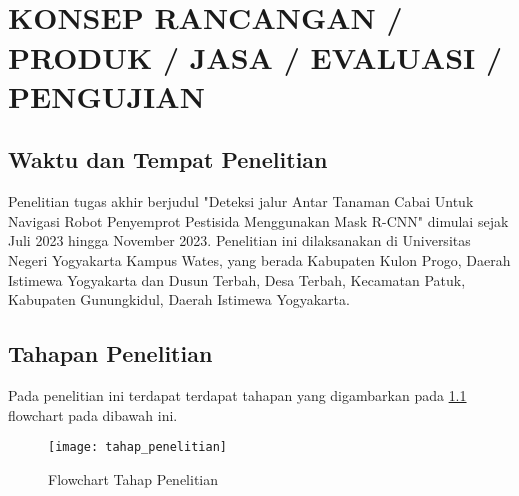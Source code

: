 
\chapter[KONSEP RANCANGAN / PRODUK / JASA / EVALUASI / PENGUJIAN]{\\ KONSEP RANCANGAN / PRODUK / JASA / EVALUASI / PENGUJIAN}

\section{Waktu dan Tempat Penelitian}
Penelitian tugas akhir berjudul "Deteksi jalur Antar Tanaman Cabai Untuk Navigasi Robot Penyemprot Pestisida Menggunakan Mask R-CNN" dimulai sejak Juli 2023 hingga November
2023. Penelitian ini dilaksanakan di Universitas Negeri Yogyakarta Kampus Wates, yang berada Kabupaten Kulon Progo, Daerah Istimewa Yogyakarta dan Dusun Terbah, Desa Terbah, Kecamatan Patuk, Kabupaten Gunungkidul, Daerah Istimewa Yogyakarta.

\section{Tahapan Penelitian}
Pada penelitian ini terdapat terdapat tahapan yang digambarkan pada  \cref{fig:flowchart} flowchart pada dibawah ini. 

\begin{figure}[H]
	\centering
	\texttt{[image: tahap\_penelitian]}
	\caption{Flowchart Tahap Penelitian}
	\label{fig:flowchart}
\end{figure}

